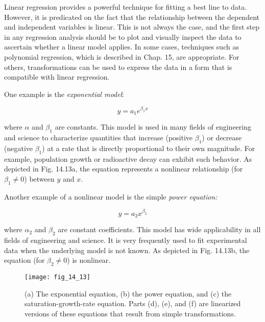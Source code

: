 \documentclass[../main.tex]{subfiles}
\begin{document}
Linear regression provides a powerful technique for fitting a best line to data. However, it is predicated on the fact that the relationship between the dependent and independent variables is linear. This is not always the case, and the first step in any regression analysis should be to plot and visually inspect the data to ascertain whether a linear model applies. In some cases, techniques such as polynomial regression, which is described in Chap. 15, are appropriate. For others, transformations can be used to express the data in a form that is compatible with linear regression.

One example is the \textit{exponential model}:

\begin{equation}
	\tag{14.22}
	y = a_1 e^{\beta_1 x}
\end{equation}

\noindent where $\alpha$ and $\beta_1$ are constants. This model is used in many fields of engineering and science to characterize quantities that increase (positive $\beta_1$) or decrease (negative $\beta_1$) at a rate that is directly proportional to their own magnitude. For example, population growth or radioactive decay can exhibit such behavior. As depicted in Fig. 14.13a, the equation represents a nonlinear relationship (for $\beta_1 \neq 0$) between $y$ and $x$.

Another example of a nonlinear model is the simple \textit{power equation:}

\begin{equation}
	\tag{14.23}
	y = a_2 x^{\beta_2}
\end{equation}

\noindent where $\alpha_2$ and $\beta_2$ are constant coefficients. This model has wide applicability in all fields of engineering and science. It is very frequently used to fit experimental data when the underlying model is not known. As depicted in Fig. 14.13b, the equation (for $\beta_2 \neq 0$) is nonlinear.

\begin{figure}[H]
	\centering
	\texttt{[image: fig\_14\_13]}
	\caption{\textsf{(a) The exponential equation, (b) the power equation, and (c) the saturation-growth-rate equation. Parts (d), (e), and (f) are linearized versions of these equations that result from simple transformations.}}
	\label{fig:fig_14_13}
	\label{fig:fig_14_13a}
	\label{fig:fig_14_13b}
	\label{fig:fig_14_13c}
	\label{fig:fig_14_13d}
	\label{fig:fig_14_13e}
	\label{fig:fig_14_13f}
\end{figure}
\end{document}
